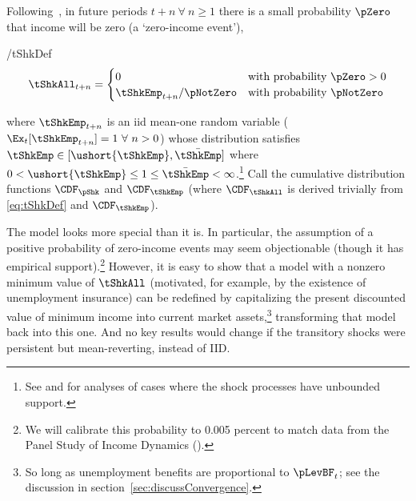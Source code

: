 \documentclass[BufferStockTheory]{subfiles}
\begin{document}
Following~\cite{zeldesStochastic}, in future periods $t+n ~\forall~ n \geq 1$ there is a small probability $\pZero$ that income will be zero (a `zero-income event'),
\begin{verbatimwrite}{\EqDir/tShkDef}
  \begin{equation}
    \tShkAll _{t+n}=
    \begin{cases}
      0\phantom{_{t+1}/\pNotZero} & \text{with probability $\pZero>0$} \\
      \tShkEmp_{t+n}/\pNotZero      & \text{with probability $\pNotZero  $} %
    \end{cases} \label{eq:tShkDef}
  \end{equation}
\end{verbatimwrite}

where $\tShkEmp_{t+n}$ is an iid mean-one random variable
($\Ex_{t}[{\tShkEmp}_{t+n}]=1~\forall~n>0$)
whose distribution satisfies $\tShkEmp \in \lbrack \ushort{\tShkEmp},\bar{\tShkEmp}\rbrack$
where $0<\ushort{\tShkEmp} \leq 1 \leq \bar{\tShkEmp}<\infty$.\footnote{See \cite{rabaultBorrowing} and \cite{lsIncFluct} for analyses of cases where the shock processes have unbounded support.}  Call the cumulative
distribution functions $\CDF_{\pShk}$ and $\CDF_{\tShkEmp}$ (where $\CDF_{\tShkAll}$
 is derived trivially from \eqref{eq:tShkDef} and $\CDF_{\tShkEmp}$).

\hypertarget{PDV}{}
The model looks more special than it is.  In particular, the
assumption of a positive probability of zero-income events may seem
objectionable (though it has empirical support).\footnote{We will calibrate this probability to 0.005 percent to match data from the Panel Study of Income Dynamics (\cite{carrollBrookings}).}
However, it is easy to show that a model with a
nonzero minimum value of $\tShkAll$ (motivated, for example, by the
existence of unemployment insurance) can be redefined by capitalizing
the present discounted value of minimum income into current market assets,\footnote{So long
  as unemployment benefits are
  proportional to $\pLevBF_{t}$; see the discussion in
  section~\ref{sec:discussConvergence}.}  transforming
that model back into this one.  And no key results would change if the transitory shocks were persistent but mean-reverting, instead of IID.
\end{document}
